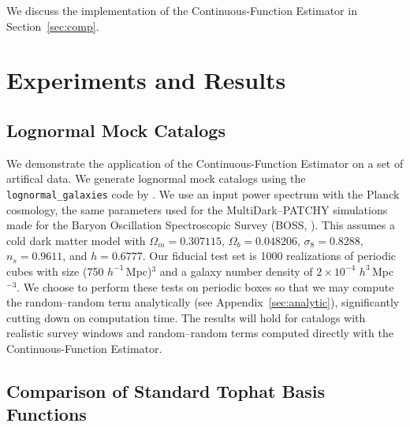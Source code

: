 \documentclass[modern]{aastex62}
\newcommand{\est}{the Continuous-Function Estimator\xspace}
\newcommand{\hmpc}{$h^{-1}\,$Mpc}
\begin{document}
We discuss the implementation of \est in Section~\ref{sec:comp}.


\section{Experiments and Results}
\label{sec:experiments}

\subsection{Lognormal Mock Catalogs}

We demonstrate the application of \est on a set of artifical data.
We generate lognormal mock catalogs \citep{ColesJones1991} using the \texttt{lognormal\_galaxies} code by \citep{Agrawal2017}.
We use an input power spectrum with the Planck cosmology, the same parameters used for the MultiDark--PATCHY simulations \citep{Kitaura2016} made for the Baryon Oscillation Spectroscopic Survey (BOSS, \citealt{Dawson2013}).
This assumes a cold dark matter model with $\Omega_m = 0.307115$, $\Omega_b = 0.048206$, $\sigma_8 = 0.8288$, $n_s = 0.9611$, and $h = 0.6777$.
Our fiducial test set is 1000 realizations of periodic cubes with size (750 \hmpc)$^3$ and a galaxy number density of $2 \times 10^{-4}$ $h^{3}\,$Mpc$^{-3}$.
We choose to perform these tests on periodic boxes so that we may compute the random--random term analytically (see Appendix~\ref{sec:analytic}), significantly cutting down on computation time.
The results will hold for catalogs with realistic survey windows and random--random terms computed directly with \est.

\subsection{Comparison of Standard Tophat Basis Functions}
\end{document}
